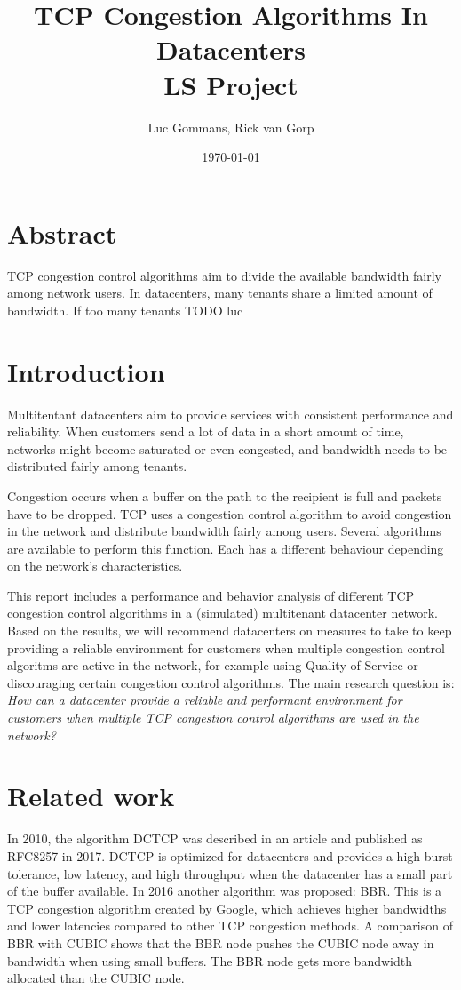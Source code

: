 \documentclass{article}
\title{TCP Congestion Algorithms In Datacenters \\
	\vspace{0.3cm}
	{\large LS Project}
}
\date{\today{}}
\author{Luc Gommans, Rick van Gorp}
\begin{document}
\maketitle

\section{Abstract}

TCP congestion control algorithms aim to divide the available bandwidth fairly
among network users. In datacenters, many tenants share a limited amount of bandwidth.
If too many tenants TODO luc


\section{Introduction}

Multitentant datacenters aim to provide services with consistent performance
and reliability. When customers send a lot of data in a short amount of time,
networks might become saturated or even congested, and bandwidth needs to be
distributed fairly among tenants.

Congestion occurs when a buffer on the path to the recipient is full and
packets have to be dropped. TCP uses a congestion control algorithm to avoid
congestion in the network and distribute bandwidth fairly among users. Several
algorithms are available to perform this function. Each has a different behaviour
depending on the network's characteristics.

This report includes a performance and behavior analysis of different TCP congestion control algorithms in a (simulated) multitenant datacenter network. Based on the results, we will recommend datacenters on measures to take to keep providing a reliable environment for customers when multiple congestion control algoritms are active in the network, for example using Quality of Service or discouraging certain congestion control algorithms. The main research question is: {\it How can a datacenter provide a reliable and performant environment for customers when multiple TCP congestion control algorithms are used in the
network?}


\section{Related work}


In 2010, the algorithm DCTCP was described in an
article\cite{dctcp-congestion-original} and published as RFC8257 in
2017\cite{dctcp-congestion}. DCTCP is optimized for datacenters and provides a
high-burst tolerance, low latency, and high throughput when the datacenter has
a small part of the buffer available\cite{dctcp-congestion}. In 2016 another
algorithm was proposed: BBR. This is a TCP congestion algorithm created by
Google, which achieves higher bandwidths and lower latencies compared to other
TCP congestion methods\cite{bbr-congestion}. A comparison of BBR with
CUBIC\cite{bbr-congestion-comparison} shows that the BBR node pushes the CUBIC
node away in bandwidth when using small buffers. The BBR node gets more
bandwidth allocated than the CUBIC node.
\end{document}
